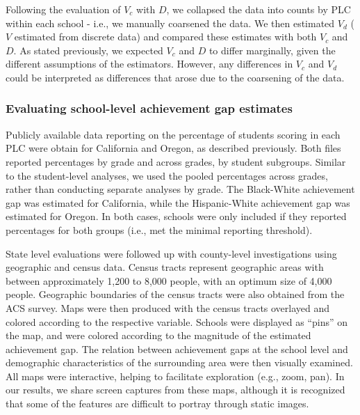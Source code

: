 \documentclass[man, fleqn, noextraspace]{apa6}
\theoremstyle{definition}
\theoremstyle{definition}
\theoremstyle{definition}
\theoremstyle{remark}
\begin{document}
Following the evaluation of \(V_c\) with \(D\), we collapsed the data
into counts by PLC within each school - i.e., we manually coarsened the
data. We then estimated \(V_d\) (\(V\) estimated from discrete data) and
compared these estimates with both \(V_c\) and \(D\). As stated
previously, we expected \(V_c\) and \(D\) to differ marginally, given
the different assumptions of the estimators. However, any differences in
\(V_c\) and \(V_d\) could be interpreted as differences that arose due
to the coarsening of the data.

\hypertarget{evaluating-school-level-achievement-gap-estimates}{%
\subsubsection{Evaluating school-level achievement gap
estimates}\label{evaluating-school-level-achievement-gap-estimates}}

Publicly available data reporting on the percentage of students scoring
in each PLC were obtain for California and Oregon, as described
previously. Both files reported percentages by grade and across grades,
by student subgroups. Similar to the student-level analyses, we used the
pooled percentages across grades, rather than conducting separate
analyses by grade. The Black-White achievement gap was estimated for
California, while the Hispanic-White achievement gap was estimated for
Oregon. In both cases, schools were only included if they reported
percentages for both groups (i.e., met the minimal reporting threshold).

State level evaluations were followed up with county-level
investigations using geographic and census data. Census tracts represent
geographic areas with between approximately 1,200 to 8,000 people, with
an optimum size of 4,000 people. Geographic boundaries of the census
tracts were also obtained from the ACS survey. Maps were then produced
with the census tracts overlayed and colored according to the respective
variable. Schools were displayed as \enquote{pins} on the map, and were
colored according to the magnitude of the estimated achievement gap. The
relation between achievement gaps at the school level and demographic
characteristics of the surrounding area were then visually examined. All
maps were interactive, helping to facilitate exploration (e.g., zoom,
pan). In our results, we share screen captures from these maps, although
it is recognized that some of the features are difficult to portray
through static images.
\end{document}
